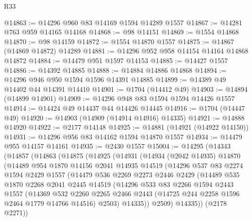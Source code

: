 \begin{lexlean}{R33}
\begin{coremodule}
@14863 := @14296 @960 @83 @14169 @1594 @14289 @1557
@14867 := @14281 @763 @959 @14165 @14168
@14868 := @98 @14151
@14869 := @1554 @14868
@14870 := @98 @14159
@14872 := @1554 @14870 @1557
@14875 := @14867 (@14869 @14872) @14289
@14881 := @14296 @952 @958 @14154 @14164 @14868 @14872
@14884 := @14479 @951 @1597 @14153
@14885 := @14427 @1557
@14886 := @14392 @14885
@14888 := @14884 @14886 @14868
@14894 := @14296 @946 @950 @1594 @1596 @14391 @14885
@14899 := @14389 @49 @14402 @44 @14391 @14410
@14901 := @1704 (@14412 @49)
@14903 := @14894 (@14899 @14901)
@14909 := @14296 @948 @83 @1594 @1594 @14426 @1557
@14914 := @14424 @49 @14437 @44 @14426 @14445
@14916 := @1704 (@14447 @49)
@14920 := @14903 (@14909 (@14914 @14916) @14335)
@14921 := @14888 @14920
@14922 := @2177 @14148
@14925 := @14881 (@14921 (@14922 @14150))
@14931 := @14296 @956 @83 @14162 @1594 @14870 @1557
@14934 := @14479 @955 @14157 @14161
@14935 := @2430 @1557
@15004 := @14295
    (@14343
      (@14857
        (@14863
          (@14875
            (@14925
              (@14931
                (@14934
                  (@2042 @14935)
                  @14870
                  (@14489
                    @954
                    @1870
                    @14156
                    @2041
                    @14935
                    @14519
                    (@14296
                      @537
                      @83
                      @2274
                      @1594
                      @2429
                      @1557
                      (@14479
                        @536
                        @2269
                        @2273
                        @2446
                        @2429
                        (@14489
                          @535
                          @1870
                          @2268
                          @2041
                          @2445
                          @14519
                          (@14296
                            @533
                            @83
                            @2266
                            @1594
                            @2443
                            @1557
                            (@14369
                              @532
                              @2260
                              @2265
                              @2466
                              @2443
                              (@14725 @244 @2258 @1596 @2464 @1779 @14766 @14516)
                              @2503)
                            @14335))
                        @2509)
                      @14335))
                  (@2178 @2271))

\end{coremodule}
\end{lexlean}
